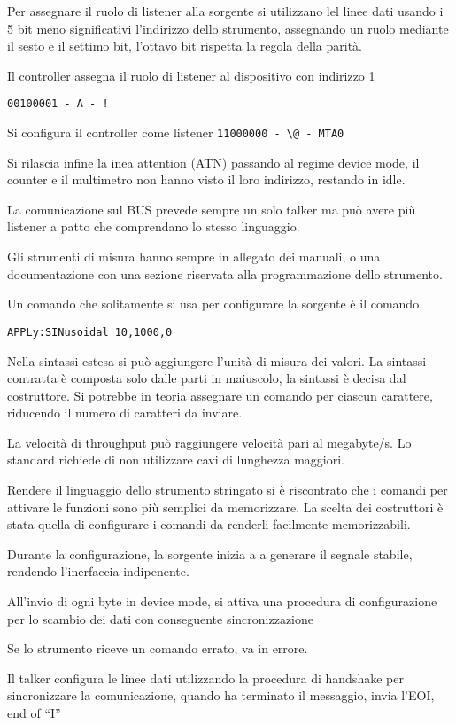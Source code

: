 Per assegnare il ruolo di listener alla sorgente si utilizzano lel linee dati
usando i 5 bit meno significativi l'indirizzo dello strumento, assegnando un
ruolo mediante il sesto e il settimo bit, l'ottavo bit rispetta la regola della
parità.

Il controller assegna il ruolo di listener al dispositivo con indirizzo 1

\verb|00100001 - A - !|

Si configura il controller come listener
\verb|11000000 - \@ - MTA0|

Si rilascia infine la inea attention (ATN) passando al regime device mode, il
counter e il multimetro non hanno visto il loro indirizzo, restando in idle.

La comunicazione sul BUS prevede sempre un solo talker ma può avere più
listener a patto che comprendano lo stesso linguaggio.

Gli strumenti di misura hanno sempre in allegato dei manuali, o una
documentazione con una sezione riservata alla programmazione dello strumento.

Un comando che solitamente si usa per configurare la sorgente è il comando

\verb|APPLy:SINusoidal 10,1000,0|

Nella sintassi estesa si può aggiungere l'unità di misura dei valori.
La sintassi contratta è composta solo dalle parti in maiuscolo, la sintassi è
decisa dal costruttore.
Si potrebbe in teoria assegnare un comando per ciascun carattere, riducendo il
numero di caratteri da inviare.

La velocità di throughput può raggiungere velocità pari al megabyte/s.
Lo standard richiede di non utilizzare cavi di lunghezza maggiori.

Rendere il linguaggio dello strumento stringato si è riscontrato che i comandi
per attivare le funzioni sono più semplici da memorizzare.
La scelta dei costruttori è stata quella di configurare i comandi da renderli
facilmente memorizzabili.

Durante la configurazione, la sorgente inizia a a generare il segnale stabile,
rendendo l'inerfaccia indipenente.

All'invio di ogni byte in device mode, si attiva una procedura di
configurazione per lo scambio dei dati con conseguente sincronizzazione

Se lo strumento riceve un comando errato, va in errore.

Il talker configura le linee dati utilizzando la procedura di handshake per
sincronizzare la comunicazione, quando ha terminato il messaggio, invia l'EOI,
end of ``I''

